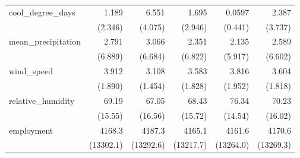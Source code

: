 \begin{table}[htbp]
\begin{tabular}{l*{5}{D{.}{.}{-1}}}
\addlinespace
cool\_degree\_days    &       1.189&       6.551&       1.695&      0.0597&       2.387\\
                    &     (2.346)&     (4.075)&     (2.946)&     (0.441)&     (3.737)\\
\addlinespace
mean\_precipitation  &       2.791&       3.066&       2.351&       2.135&       2.589\\
                    &     (6.889)&     (6.684)&     (6.822)&     (5.917)&     (6.602)\\
\addlinespace
wind\_speed          &       3.912&       3.108&       3.583&       3.816&       3.604\\
                    &     (1.890)&     (1.454)&     (1.828)&     (1.952)&     (1.818)\\
\addlinespace
relative\_humidity   &       69.19&       67.05&       68.43&       76.34&       70.23\\
                    &     (15.55)&     (16.56)&     (15.72)&     (14.54)&     (16.02)\\
\addlinespace
employment          &      4168.3&      4187.3&      4165.1&      4161.6&      4170.6\\
                    &   (13302.1)&   (13292.6)&   (13217.7)&   (13264.0)&   (13269.3)\\
\bottomrule
\end{tabular}
\end{table}

